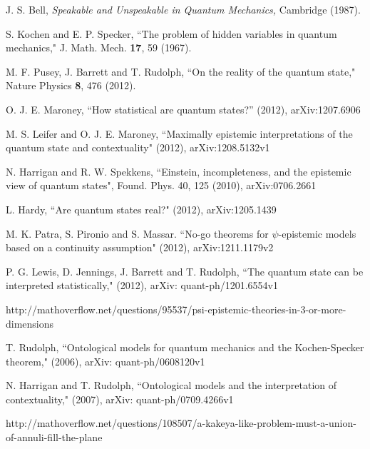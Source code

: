 \documentclass[letterpaper,12pt]{article}
\begin{document}
\begin{thebibliography}{9}
 J. S. Bell, \textit{Speakable and Unspeakable in Quantum Mechanics,} Cambridge (1987).

 S. Kochen and E. P. Specker, ``The problem of hidden variables
in quantum mechanics," J. Math. Mech. \textbf{17}, 59 (1967).

 M. F. Pusey, J. Barrett and T. Rudolph, ``On the reality of
the quantum state," Nature Physics \textbf{8}, 476 (2012).

 O. J. E. Maroney, ``How statistical are quantum states?''
(2012), arXiv:1207.6906

 M. S. Leifer and O. J. E. Maroney, ``Maximally epistemic
interpretations of the quantum state and contextuality" (2012),
arXiv:1208.5132v1

 N. Harrigan and R. W. Spekkens, ``Einstein, incompleteness, and the epistemic view of quantum states", Found. Phys. 40, 125 (2010), arXiv:0706.2661


 L. Hardy, ``Are quantum states real?" (2012), arXiv:1205.1439

 M. K. Patra, S. Pironio and S. Massar. ``No-go theorems for $\psi$-epistemic models based on a continuity assumption" (2012), arXiv:1211.1179v2

 P. G. Lewis, D. Jennings, J. Barrett and T. Rudolph, ``The
quantum state can be interpreted statistically," (2012), arXiv:
quant-ph/1201.6554v1

http://mathoverflow.net/questions/95537/psi-epistemic-theories-in-3-or-more-dimensions

 T. Rudolph, ``Ontological models for quantum mechanics and
the Kochen-Specker theorem," (2006), arXiv: quant-ph/0608120v1

 N. Harrigan and T. Rudolph, ``Ontological models and the
interpretation of contextuality," (2007), arXiv: quant-ph/0709.4266v1

http://mathoverflow.net/questions/108507/a-kakeya-like-problem-must-a-union-of-annuli-fill-the-plane
\end{thebibliography}
\end{document}
